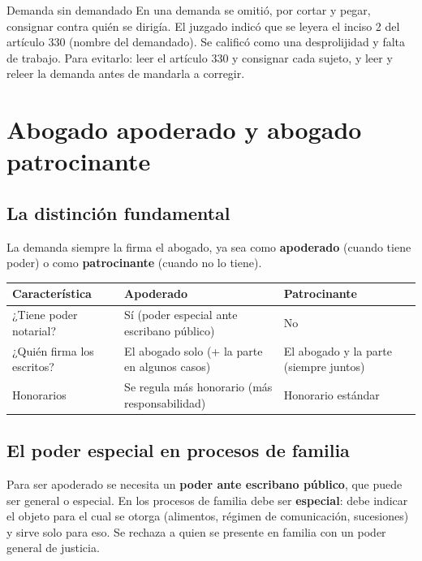 \documentclass[12pt,oneside]{book}
\begin{document}
\begin{example}{Demanda sin demandado}
En una demanda se omitió, por cortar y pegar, consignar contra quién se dirigía. El juzgado indicó que se leyera el inciso 2 del artículo 330 (nombre del demandado). Se calificó como una desprolijidad y falta de trabajo. Para evitarlo: leer el artículo 330 y consignar cada sujeto, y leer y releer la demanda antes de mandarla a corregir.
\end{example}

\section{Abogado apoderado y abogado patrocinante}

\subsection{La distinción fundamental}

La demanda siempre la firma el abogado, ya sea como \textbf{apoderado} (cuando tiene poder) o como \textbf{patrocinante} (cuando no lo tiene).

\begin{table}[H]
\centering
\small
\begin{tabularx}{\textwidth}{>{\raggedright\arraybackslash}p{}>{\raggedright\arraybackslash}X>{\raggedright\arraybackslash}X}
\toprule
\textbf{Característica} & \textbf{Apoderado} & \textbf{Patrocinante} \\
\midrule
¿Tiene poder notarial? & Sí (poder especial ante escribano público) & No \\
¿Quién firma los escritos? & El abogado solo (+ la parte en algunos casos) & El abogado y la parte (siempre juntos) \\
Honorarios & Se regula más honorario (más responsabilidad) & Honorario estándar \\
\bottomrule
\end{tabularx}
\end{table}

\subsection{El poder especial en procesos de familia}

Para ser apoderado se necesita un \textbf{poder ante escribano público}, que puede ser general o especial. En los procesos de familia debe ser \textbf{especial}: debe indicar el objeto para el cual se otorga (alimentos, régimen de comunicación, sucesiones) y sirve solo para eso. Se rechaza a quien se presente en familia con un poder general de justicia.
\end{document}
